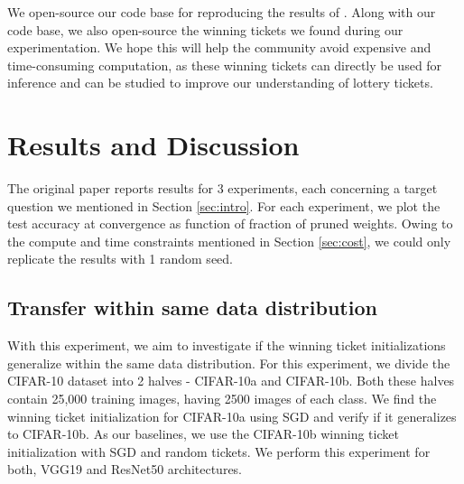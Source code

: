     We open-source our code base for reproducing the results of \cite{repro_paper}. Along with our code base, we also open-source the winning tickets we found during our experimentation. We hope this will help the community avoid expensive and time-consuming computation, as these winning tickets can directly be used for inference and can be studied to improve our understanding of lottery tickets. 
    
    \section{Results and Discussion}
    \label{sec:results}
    The original paper reports results for 3 experiments, each concerning a target question we mentioned in Section \ref{sec:intro}. For each experiment, we plot the test accuracy at convergence as function of fraction of pruned weights. Owing to the compute and time constraints mentioned in Section \ref{sec:cost}, we could only replicate the results with 1 random seed. 
    
    \subsection{Transfer within same data distribution}
    With this experiment, we aim to investigate if the winning ticket initializations generalize within the same data distribution. For this experiment, we divide the CIFAR-10 dataset into 2 halves - CIFAR-10a and CIFAR-10b. Both these halves contain 25,000 training images, having 2500 images of each class. We find the winning ticket initialization for CIFAR-10a using SGD and verify if it generalizes to CIFAR-10b. As our baselines, we use the CIFAR-10b winning ticket initialization with SGD and random tickets. We perform this experiment for both, VGG19 and ResNet50 architectures.
        

